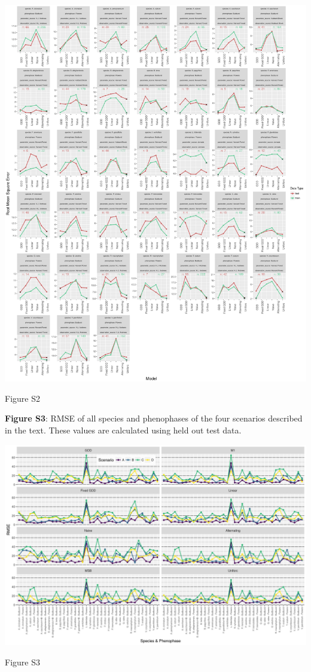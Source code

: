 \documentclass[a4paper,12pt]{article}
\begin{document}
\newpage

\begin{center}
	\centering
		\includegraphics[width=1\textwidth]{supplement_best_lter_models.png}
	\caption{Figure S2}
\end{center}


\newpage

\textbf{Figure S3}: RMSE of all species and phenophases of the four scenarios described in the text. These values are calculated using held out test data.

\newpage

\begin{center}
	\centering
		\includegraphics[width=1\textwidth]{supplement_scenario_absolute_rmse.png}
	\caption{Figure S3}
\end{center}
\end{document}
